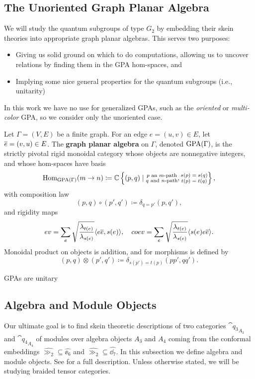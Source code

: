\subsection{The Unoriented Graph Planar Algebra}
We will study the quantum subgroups of type $G_2$ by embedding their skein theories into appropriate graph planar algebras. This serves two purposes:
\begin{itemize}
    \item Giving us solid ground on which to do computations, allowing us to uncover relations by finding them in the GPA hom-spaces, and
    \item Implying some nice general properties for the quantum subgroups (i.e., unitarity)
\end{itemize}
In this work we have no use for generalized GPAs, such as the {\it oriented} \cite{Cain_Dan} or {\it multi-color} GPA, so we consider only the unoriented case. 

\begin{definition}\label{def:GPA}
    Let $\Gamma=(V,E)$ be a finite graph. For an edge $e=(u,v)\in E$, let $\overline{e}=(v,u)\in E$. The {\bf graph planar algebra} on $\Gamma$, denoted $\operatorname{GPA}(\Gamma)$, is the strictly pivotal rigid monoidal category whose objects are nonnegative integers, and whose hom-spaces have basis
    \[
        \operatorname{Hom}_{\operatorname{GPA}(\Gamma)}(m\to n) \coloneqq \mathbb{C}\left\{ (p,q) \mid \substack{\text{$p$ an $m$-path} \\ \text{$q$ and $n$-path}}, \substack{\text{$s(p)=s(q)$}\\ \text{$t(p)=t(q)$}} \right\},
    \]
    with composition law
    \[
        (p,q)\circ(p',q')\coloneqq \delta_{q=p'} (p,q'),
    \]
    and rigidity maps
    \[
        ev = \sum_e \sqrt{ \frac{\lambda_{t(e)}}{\lambda_{s(e)}} } \langle e\overline{e},s(e) \rangle, \quad coev = \sum_e \sqrt{ \frac{\lambda_{t(e)}}{\lambda_{s(e)}} } \langle s(e) e\overline{e} \rangle. 
    \]
    Monoidal product on objects is addition, and for morphisms is defined by 
    \[
        (p,q)\otimes(p',q')\coloneqq \delta_{s(p')=t(p)} (pp',qq').
    \]
\end{definition}



\begin{lemma}
    GPAs are unitary
\end{lemma}





\subsection{Algebra and Module Objects}
Our ultimate goal is to find skein theoretic descriptions of two categories $\cat{q_3}_{A_3}$ and $\cat{q_4}_{A_4}$ of modules over algebra objects $A_3$ and $A_4$ coming from the conformal embeddings $\hat{\gg_2}\subseteq \hat{\ee_6}$ and $\hat{\gg_2}\subseteq \hat{\dd_7}$. In this subsection we define algebra and module objects. See \cite{} for a full description. Unless otherwise stated, we will be studying braided tensor categories.

